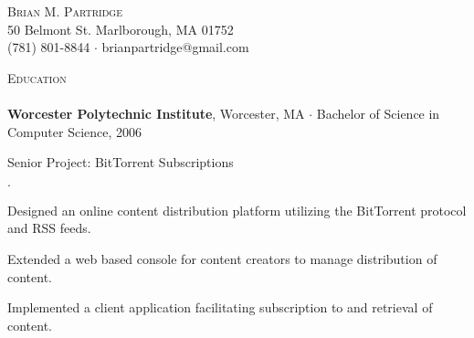 \documentclass[11pt]{article}
\newcommand{\mydot}{$\cdot$ }
\newcommand{\lineunder}{\vspace*{-8pt} \\ \hspace*{-18pt} \hrulefill \\}
\newcommand{\header}[1]{{\hspace*{-15pt}\vspace*{6pt} \textsc{#1}} \vspace*{-6pt} \lineunder}
\newcommand{\contact}[3]{\vspace*{-8pt}\begin{center}{\LARGE \scshape {#1}}\\#2 \\ #3\end{center}\vspace*{-8pt}}
\newcommand{\school}[3]{\textbf{#1}{#2} \mydot #3 \\}
\newenvironment{courses}{\begin{list}{\mydot}{\topsep 0pt \itemsep -2pt}}{\vspace*{4pt}\end{list}}
\newcommand{\seniorproject}[2]{Senior Project: #1\\ #2  }
\newenvironment{achievements}{\begin{list}{\mydot}{\topsep 0pt \itemsep -2pt}}{\vspace*{4pt}\end{list}}
\begin{document}
\small
\smallskip
\vspace*{-44pt}


\contact{Brian M. Partridge}
{50 Belmont St. Marlborough, MA 01752}
{
(781) 801-8844
\mydot brianpartridge@gmail.com 
}


\header{Education}
\school{Worcester Polytechnic Institute}{, Worcester, MA}{Bachelor of Science in Computer Science, 2006}

\begin{comment}
Selected Coursework:
\vspace*{-10pt}
\begin{multicols}{3}
\begin{courses}
  \item Operating Systems
  \item Distributed Computer Systems
  \item Software Engineering
  \item Computer Networks
  \item Human-Computer Interaction
  \item Databases
  \item Algorithms
  \item Webware
\end{courses}
\end{multicols}
\vspace*{-12pt}
\end{comment}

\seniorproject{BitTorrent Subscriptions}{
\begin{achievements}
  \item Designed an online content distribution platform utilizing the BitTorrent protocol and RSS feeds.
  \item Extended a web based console for content creators to manage distribution of content.
  \item Implemented a client application facilitating subscription to and retrieval of content.
\end{achievements}
}

\end{document}

